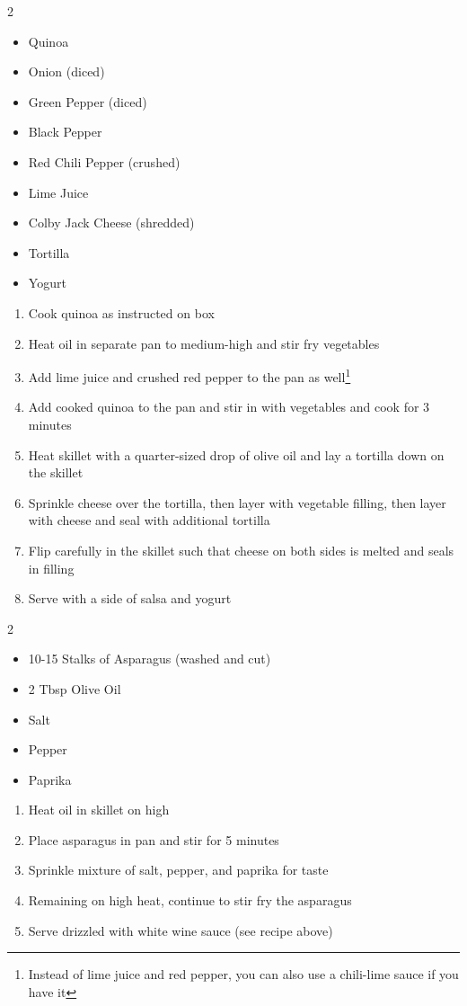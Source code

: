 \documentclass[oneside]{recipe}
\newcommand{\recipecolumn}[2]{
	\begin{multicols}{2}
	\raggedcolumns
	#1
	\columnbreak
	#2
	\end{multicols}
}
\begin{document}
\newpage
{}
\recipecolumn{
	\begin{itemize}
		\item Quinoa
		\item Onion (diced)
		\item Green Pepper (diced)
		\item Black Pepper
		\item Red Chili Pepper (crushed)
		\item Lime Juice
		\item Colby Jack Cheese (shredded)
		\item Tortilla
		\item Yogurt
	\end{itemize}

}{
	\begin{enumerate}
		\item Cook quinoa as instructed on box
		\item Heat oil in separate pan to medium-high and stir fry vegetables
		\item Add lime juice and crushed red pepper to the pan as well\footnote{Instead of lime juice and red pepper, you can also use a chili-lime sauce if you have it}
		\item Add cooked quinoa to the pan and stir in with vegetables and cook for 3 minutes
		\item Heat skillet with a quarter-sized drop of olive oil and lay a tortilla down on the skillet
		\item Sprinkle cheese over the tortilla, then layer with vegetable filling, then layer with cheese and seal with additional tortilla
		\item Flip carefully in the skillet such that cheese on both sides is melted and seals in filling
		\item Serve with a side of salsa and yogurt
	\end{enumerate}
}

\recipecolumn{
	\begin{itemize}
	\item 10-15 Stalks of Asparagus (washed and cut)
	\item 2 Tbsp Olive Oil
	\item Salt 
	\item Pepper 
	\item Paprika
	\end{itemize}
}{
	\begin{enumerate}
	\item Heat oil in skillet on high
	\item Place asparagus in pan and stir for 5 minutes 
	\item Sprinkle mixture of salt, pepper, and paprika for taste
	\item Remaining on high heat, continue to stir fry the asparagus
	\item Serve drizzled with white wine sauce (see recipe above)
	\end{enumerate}
}
\end{document}
